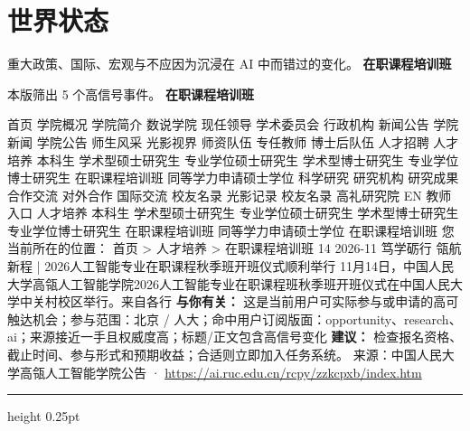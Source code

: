 \documentclass[10.5pt]{ctexart}
\begin{document}
\section*{世界状态}
{\color{ormuted} 重大政策、国际、宏观与不应因为沉浸在 AI 中而错过的变化。}
\vspace{2mm}
{\LARGE\bfseries 在职课程培训班}\par
\vspace{1mm}
{\color{ormuted} 本版筛出 5 个高信号事件。}
\vspace{3mm}
{\Large\bfseries 在职课程培训班}\par
首页 学院概况 学院简介 数说学院 现任领导 学术委员会 行政机构 新闻公告 学院新闻 学院公告 师生风采 光影视界 师资队伍 专任教师 博士后队伍 人才招聘 人才培养 本科生 学术型硕士研究生 专业学位硕士研究生 学术型博士研究生 专业学位博士研究生 在职课程培训班 同等学力申请硕士学位 科学研究 研究机构 研究成果 合作交流 对外合作 国际交流 校友名录 光影记录 校友名录 高礼研究院 EN 教师入口 人才培养 本科生 学术型硕士研究生 专业学位硕士研究生 学术型博士研究生 专业学位博士研究生 在职课程培训班 同等学力申请硕士学位 在职课程培训班 您当前所在的位置： 首页 > 人才培养 > 在职课程培训班 14 2026-11 笃学砺行 瓴航新程 | 2026人工智能专业在职课程秋季班开班仪式顺利举行 11月14日，中国人民大学高瓴人工智能学院2026人工智能专业在职课程班秋季班开班仪式在中国人民大学中关村校区举行。来自各行
\textbf{与你有关：} 这是当前用户可实际参与或申请的高可触达机会；参与范围：北京 / 人大；命中用户订阅版面：opportunity、research、ai；来源接近一手且权威度高；标题/正文包含高信号变化
\textbf{建议：} 检查报名资格、截止时间、参与形式和预期收益；合适则立即加入任务系统。
{\footnotesize\color{ormuted} 来源：中国人民大学高瓴人工智能学院公告 · \url{https://ai.ruc.edu.cn/rcpy/zzkcpxb/index.htm}}
\vspace{4mm}
\hrule height 0.25pt
\vspace{3mm}
\end{document}
